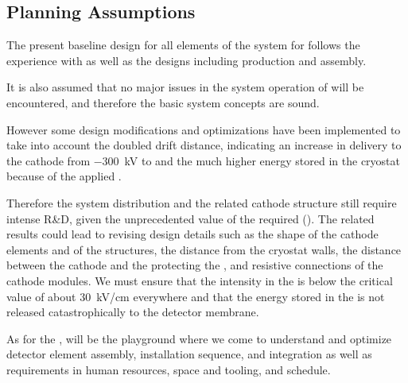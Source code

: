 \subsection{Planning Assumptions}
\label{sec:fddp-hv-org-assmp}

The present baseline design for all elements of the  system for  follows the experience with  as well as the  designs including production and assembly.  

It is also assumed that no major issues in the  system operation of  will be encountered, and therefore the basic  system concepts are sound.

However some design modifications and optimizations have been implemented to take into account the %
doubled drift distance, indicating an increase in  delivery to the cathode from \SI{-300}{\kV} to \dptargetdriftvoltneg{} and the much higher energy stored in the cryostat because of the applied .

Therefore the \dual {} system distribution and the related cathode structure still require intense R\&D, given the unprecedented value of the required  (\dptargetdriftvoltneg).
The related results could lead to revising design details such as the shape of the cathode elements and of the %
 structures, the distance from the cryostat walls, the distance between the cathode and the %
 protecting the , and resistive connections of the cathode modules. We must ensure that the \efield intensity in the \lar is below the critical value of  about \SI{30}{\kV/\cm} everywhere and that the energy stored in the  is not released catastrophically to the detector membrane. %

As for the ,  will be the playground where we come to understand and optimize detector element assembly, installation sequence, and integration as well as requirements in %
human resources, space and tooling, and schedule. 



%
%
%

